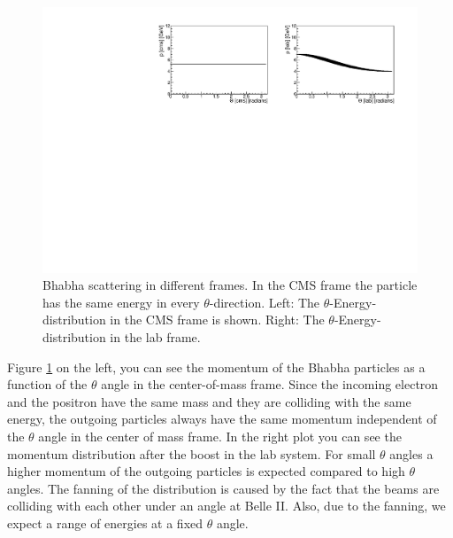 \documentclass[a4paper,11pt,twosided,final,german,openbib,pdftex,listof=totoc,bibliography=totoc]{scrbook}
\begin{document}
\begin{figure}[h!]
	\centering
\includegraphics[width=\textwidth]{Bilder/CThetaP}
	\caption[$\theta$-Momentum-Distribution In The CMS And LAB Frame]{Bhabha scattering in different frames. In the CMS frame the particle has the same energy in every $\theta$-direction. Left: The $\theta$-Energy-distribution in the CMS frame is shown. Right: The $\theta$-Energy-distribution in the lab frame.}
	\label{fig:Belle IIMomentum}
	
\end{figure}

Figure \ref{fig:Belle IIMomentum} on the left, you can see  the momentum of the Bhabha particles as a function of the $\theta$ angle in the center-of-mass frame. Since the incoming electron and the positron have the same mass and they are colliding with the same energy, the outgoing particles always have the same momentum independent of the $\theta$ angle in the center of mass frame. In the right plot you can see the momentum distribution after the boost in the lab system. For small $\theta$ angles a higher momentum of the outgoing particles is expected compared to high $\theta$ angles. The fanning of the distribution is caused by the fact that the beams are colliding with each other under an angle at Belle II. Also, due to the fanning, we expect a range of energies at a fixed $\theta$ angle.
\end{document}

